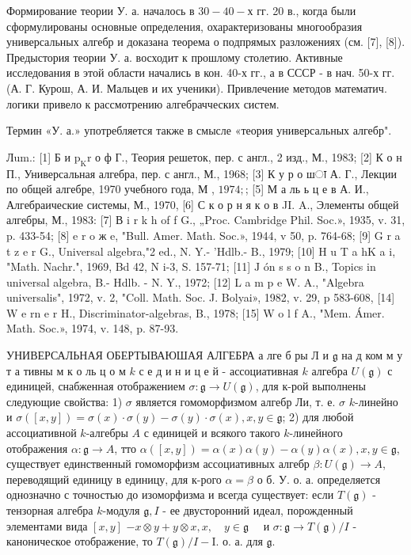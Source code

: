\documentclass[10pt]{article}
\begin{document}
Формирование теории У. а. началось в $30-40-х$ гг. 20 в., когда были сформулированы основные определения, охарактеризованы многообразия универсальных алгебр и доказана теорема о подпрямых разложениях (см. [7], [8]). Предыстория теории У. а. восходит к прошлому столетию. Активные исследования в этой области начались в кон. 40-х гг., а в СССР - в нач. 50-х гг. (А. Г. Курош, А. И. Мальцев и их ученики). Привлечение методов математич. логики привело к рассмотрению алгебрачческих систем.



Термин «У. а.» употребляется также в смысле «теория универсальных алгебр".



Лum.: [1] Б и $\mathrm{p}_{\mathrm{K}} \mathrm{r}$ о ф Г., Теория решеток, пер. с англ., 2 изд., М., 1983; [2] К о н П., Универсальная алгебра, пер. с англ., М., 1968; [3] К у р о шा А. Г., Лекции по общей алгебре, 1970 учебного года, М , $1974 ;$; [5] М а ль ь ц е в А. И., Алгебраические системы, М., 1970, [6] С к о р н я к о в JI. A., Элементы общей алгебры, М., 1983: [7] В i r k h of f G., „Proc. Cambridge Phil. Soc.», 1935, v. 31, p. 433-54; [8] e r o ж e, "Bull. Amer. Math. Soc.», 1944, v 50, p. 764-68; [9] G r a t z e r G., Universal algebra,"2 ed., N. Y.- 'Hdlb.- B., 1979; [10] H u T a hK a i, "Math. Nachr.", 1969, Bd 42, N i-3, S. 157-71; [11] $\mathrm{J}$ ón s s o n B., Topics in universal algebra, B.- Hdlb. - N. Y., 1972; [12] L a m p e W. A., "Algebra universalis", 1972, v. 2, "Coll. Math. Soc. J. Bolyai», 1982, v. 29, p 583-608, [14] W e rn e r H., Discriminator-algebras, B., 1978; [15] W o l f A., "Mem. Ámer. Math. Soc.», 1974, v. 148, p. 87-93.



УНИВЕРСАЛЬНАЯ ОБЕРТЫВАЮШАЯ АЛГЕБРА а лге б ры Л и $\mathfrak{g}$ на д ком м у т а тивны м к о ль ц о м $k$ с е д и н и ц е й - ассоциативная $k$ алгебра $U(\mathfrak{g})$ с единицей, снабженная отображением $\sigma: \mathfrak{g} \rightarrow U(\mathfrak{g})$, для к-рой выполнены следующие свойства: 1) $\sigma$ является гомоморфизмом алгебр Ли, т. е. $\sigma$ $k$-линейно и $\sigma([x, y])=\sigma(x) \cdot \sigma(y)-\sigma(y) \cdot \sigma(x), x, y \in \mathfrak{g}$; 2) для любой ассоциативной $k$-алгебры $A$ с единицей и всякого такого $k$-линейного отображения $\alpha: \mathfrak{g} \rightarrow A$, тто $\alpha([x, y])=\alpha(x) \alpha(y)-\alpha(y) \alpha(x), x, y \in \mathfrak{g}$, существует единственный гомоморфизм ассоциативных алгебр $\beta: U(\mathfrak{g}) \rightarrow A$, переводящий единицу в единицу, для к-рого $\alpha=\beta$ о б. У. о. а. определяется однозначно с точностью до изоморфизма и всегда существует: если $T(\mathfrak{g})$ - тензорная алгебра $k$-модуля $\mathfrak{g}, I$ - ее двусторонний идеал, порожденный элементами вида $[x, y]$ $-x \otimes y+y \otimes x, x, \quad y \in \mathfrak{g} \quad$ и $\sigma: \mathfrak{g} \rightarrow T(\mathfrak{g}) / I$ - каноническое отображение, то $T(\mathfrak{g}) / I-\mathrm{I}$. о. а. для $\mathfrak{g}$.
\end{document}
